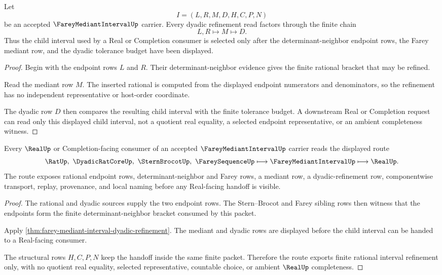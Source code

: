 \begin{theorem}
\label{thm:farey-mediant-interval-dyadic-refinement}
Let
$$
I=(L,R,M,D,H,C,P,N)
$$
be an accepted $\FareyMediantIntervalUp$ carrier. Every dyadic refinement read factors through the finite chain
$$
L,R \longmapsto M \longmapsto D .
$$
Thus the child interval used by a Real or Completion consumer is selected only after the determinant-neighbor endpoint rows, the Farey mediant row, and the dyadic tolerance budget have been displayed.
\end{theorem}
\begin{proof}
Begin with the endpoint rows $L$ and $R$. Their determinant-neighbor evidence gives the finite rational bracket that may be refined.

Read the mediant row $M$. The inserted rational is computed from the displayed endpoint numerators and denominators, so the refinement has no independent representative or host-order coordinate.

The dyadic row $D$ then compares the resulting child interval with the finite tolerance budget. A downstream Real or Completion request can read only this displayed child interval, not a quotient real equality, a selected endpoint representative, or an ambient completeness witness.
\end{proof}

\begin{theorem}
\label{thm:farey-mediant-interval-real-handoff}
Every $\RealUp$ or Completion-facing consumer of an accepted $\FareyMediantIntervalUp$ carrier reads the displayed route
$$
\RatUp,\ \DyadicRatCoreUp,\ \SternBrocotUp,\ \FareySequenceUp \longmapsto \FareyMediantIntervalUp \longmapsto \RealUp .
$$
The route exposes rational endpoint rows, determinant-neighbor and Farey rows, a mediant row, a dyadic-refinement row, componentwise transport, replay, provenance, and local naming before any Real-facing handoff is visible.
\end{theorem}
\begin{proof}
The rational and dyadic sources supply the two endpoint rows. The Stern--Brocot and Farey sibling rows then witness that the endpoints form the finite determinant-neighbor bracket consumed by this packet.

Apply \autoref{thm:farey-mediant-interval-dyadic-refinement}. The mediant and dyadic rows are displayed before the child interval can be handed to a Real-facing consumer.

The structural rows $H,C,P,N$ keep the handoff inside the same finite packet. Therefore the route exports finite rational interval refinement only, with no quotient real equality, selected representative, countable choice, or ambient $\RealUp$ completeness.
\end{proof}

